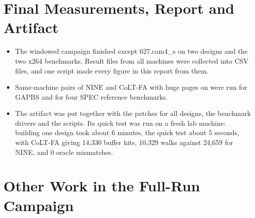\section{Final Measurements, Report and Artifact}
\label{sec:chr_final}

\begin{itemize}
    \item The windowed campaign finished except 627.cam4\_s on two designs and the two x264 benchmarks. Result files from all machines were collected into CSV files, and one script made every figure in this report from them.
    \item Same-machine pairs of NINE and CoLT-FA with huge pages on were run for GAPBS and for four SPEC reference benchmarks.
    \item The artifact was put together with the patches for all designs, the benchmark drivers and the scripts. Its quick test was run on a fresh lab machine: building one design took about 6 minutes, the quick test about 5 seconds, with CoLT-FA giving 14,330 buffer hits, 10,329 walks against 24,659 for NINE, and 0 oracle mismatches.
\end{itemize}

\section{Other Work in the Full-Run Campaign}
\label{sec:chr_fullrun_other}


